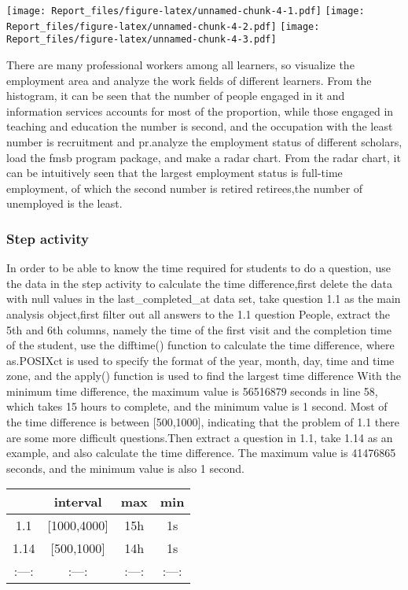 \documentclass[
]{article}
\begin{document}
\texttt{[image: Report\_files/figure-latex/unnamed-chunk-4-1.pdf]}
\texttt{[image: Report\_files/figure-latex/unnamed-chunk-4-2.pdf]}
\texttt{[image: Report\_files/figure-latex/unnamed-chunk-4-3.pdf]}

There are many professional workers among all learners, so visualize the
employment area and analyze the work fields of different learners. From
the histogram, it can be seen that the number of people engaged in it
and information services accounts for most of the proportion, while
those engaged in teaching and education the number is second, and the
occupation with the least number is recruitment and pr.analyze the
employment status of different scholars, load the fmsb program package,
and make a radar chart. From the radar chart, it can be intuitively seen
that the largest employment status is full-time employment, of which the
second number is retired retirees,the number of unemployed is the least.

\hypertarget{step-activity}{%
\subsubsection{Step activity}\label{step-activity}}

In order to be able to know the time required for students to do a
question, use the data in the step activity to calculate the time
difference,first delete the data with null values in the
last\_completed\_at data set, take question 1.1 as the main analysis
object,first filter out all answers to the 1.1 question People, extract
the 5th and 6th columns, namely the time of the first visit and the
completion time of the student, use the difftime() function to calculate
the time difference, where as.POSIXct is used to specify the format of
the year, month, day, time and time zone, and the apply() function is
used to find the largest time difference With the minimum time
difference, the maximum value is 56516879 seconds in line 58, which
takes 15 hours to complete, and the minimum value is 1 second. Most of
the time difference is between {[}500,1000{]}, indicating that the
problem of 1.1 there are some more difficult questions.Then extract a
question in 1.1, take 1.14 as an example, and also calculate the time
difference. The maximum value is 41476865 seconds, and the minimum value
is also 1 second.

\begin{longtable}[]{@{}cccc@{}}
\toprule
& interval & max & min \\
\midrule
\endhead
1.1 & {[}1000,4000{]} & 15h & 1s \\
1.14 & {[}500,1000{]} & 14h & 1s \\
:---: & :---: & :---: & :---: \\
\bottomrule
\end{longtable}
\end{document}
